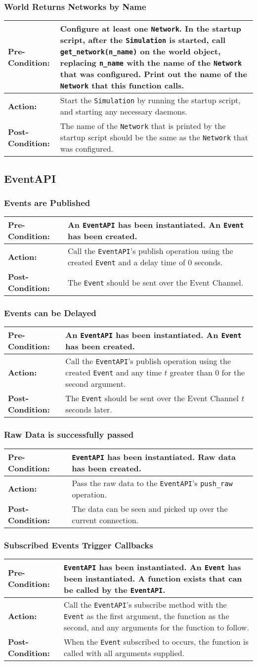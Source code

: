 \documentclass[titlepage]{article}
\newcommand{\testcase}[3]{
    \begin{center}
    \begin{tabular}{| l | p{0.7\textwidth}|}
        \hline
        \rowcolor[gray]{0.8}\textbf{Pre-Condition:} & #1 \\ \hline
        \textbf{Action:} & #2 \\ \hline
        \rowcolor[gray]{0.8}\textbf{Post-Condition:} & #3 \\ \hline
    \end{tabular}
    \end{center}
}
\begin{document}
\subsubsection{World Returns Networks by Name}
\testcase{Configure at least one \texttt{Network}.  In the startup script, after the \texttt{Simulation} is started, call \texttt{get\_network(n\_name)} on the world object, replacing \texttt{n\_name} with the name of the \texttt{Network} that was configured.  Print out the name of the \texttt{Network} that this function calls.}{Start the \texttt{Simulation} by running the startup script, and starting any necessary daemons.}{The name of the \texttt{Network} that is printed by the startup script should be the same as the \texttt{Network} that was configured.}

\subsection{EventAPI}
\subsubsection{Events are Published}
\testcase{An \texttt{EventAPI} has been instantiated. An \texttt{Event} has been created.}{Call the \texttt{EventAPI}'s publish operation using the created \texttt{Event} and a delay time of 0 seconds.}{The \texttt{Event} should be sent over the Event Channel.}

\subsubsection{Events can be Delayed}
\testcase{An \texttt{EventAPI} has been instantiated. An \texttt{Event} has been created.}{Call the \texttt{EventAPI}'s publish operation using the created \texttt{Event} and any time $t$ greater than 0 for the second argument.}{The \texttt{Event} should be sent over the Event Channel $t$ seconds later.}

\subsubsection{Raw Data is successfully passed}
\testcase{\texttt{EventAPI} has been instantiated. Raw data has been created.}{Pass the raw data to the \texttt{EventAPI}'s \texttt{push\_raw} operation.}{The data can be seen and picked up over the current connection.}

\subsubsection{Subscribed Events Trigger Callbacks}
\testcase{\texttt{EventAPI} has been instantiated.  An \texttt{Event} has been instantiated. A function exists that can be called by the \texttt{EventAPI}.}{Call the \texttt{EventAPI}'s subscribe method with the \texttt{Event} as the first argument, the function as the second, and any arguments for the function to follow.}{When the \texttt{Event} subscribed to occurs, the function is called with all arguments supplied. }
\end{document}
